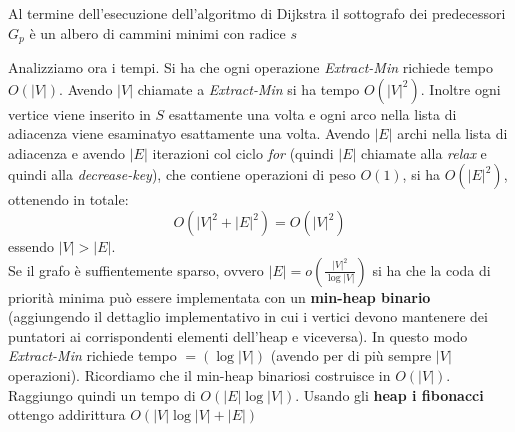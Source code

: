 \documentclass[a4paper,12pt, oneside]{book}
\begin{document}
\begin{corollario}
  Al termine dell'esecuzione dell'algoritmo di Dijkstra il sottografo
  dei predecessori $G_p$ è un albero di cammini minimi con radice
  $s$ 
\end{corollario}
Analizziamo ora i tempi. Si ha che ogni operazione
\textit{Extract-Min} richiede tempo $O(|V|)$. Avendo $|V|$ chiamate a
\textit{Extract-Min} si ha tempo $O(|V|^2)$. Inoltre ogni vertice
viene inserito in $S$ esattamente una volta e ogni arco nella lista di
adiacenza viene esaminatyo esattamente una volta. Avendo $|E|$ archi
nella lista di adiacenza e avendo $|E|$ iterazioni col ciclo
\textit{for} (quindi $|E|$ chiamate alla \textit{relax} e quindi alla
\textit{decrease-key}), che contiene operazioni di peso $O(1)$, si ha 
$O(|E|^2)$, ottenendo in totale:
\[O(|V|^2+|E|^2)=O(|V|^2)\]
essendo $|V|>|E|$.\\
Se il grafo è suffientemente sparso, ovvero $|E|=o(\frac{|V|^2}{\log
  |V|})$ si ha che la coda di priorità minima può essere implementata
con un \textbf{min-heap binario} (aggiungendo il dettaglio
implementativo in cui i vertici devono mantenere dei puntatori ai
corrispondenti elementi dell'heap e viceversa). In questo modo
\textit{Extract-Min} richiede tempo $=(\log |V|)$ (avendo per di più
sempre $|V|$ operazioni). Ricordiamo che il min-heap binariosi
costruisce in $O(|V|)$. Raggiungo quindi un tempo di $O(|E|\log
|V|)$. Usando gli \textbf{heap i fibonacci} ottengo addirittura
$O(|V|\log |V|+|E|)$
\end{document}
